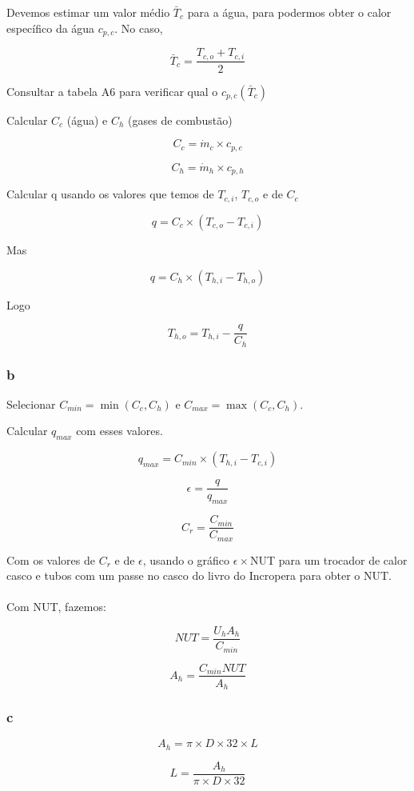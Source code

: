 \documentclass[a4paper, 12pt]{article}
\begin{document}
Devemos estimar um valor médio $\bar{T}_{c}$ para a água, para podermos obter o calor específico da água $c_{p,c}$. No caso, 

\[\bar{T}_{c} = \frac{T_{c,o}+T_{c,i}}{2}\]

Consultar a tabela A6 para verificar qual o $c_{p,c}(\bar{T}_{c})$

Calcular $C_{c}$ (água) e $C_{h}$ (gases de combustão)

\[C_{c} = \dot{m}_{c} \times c_{p,c}\]

\[C_{h} = \dot{m}_{h} \times c_{p,h}\]

Calcular q usando os valores que temos de $T_{c,i}$, $T_{c,o}$ e de $C_{c}$

\[q = C_{c} \times (T_{c,o}-T_{c,i})\]

Mas 

\[q = C_{h} \times (T_{h,i}-T_{h,o})\]

Logo

\[T_{h,o} = T_{h,i} - \frac{q}{C_{h}}\]




\subsubsection{b}

Selecionar $C_{min} = \min(C_{c},C_{h})$ e $C_{max} = \max(C_{c},C_{h})$.

Calcular $q_{max}$ com esses valores.

\[q_{max} = C_{min} \times (T_{h,i} - T_{c,i})\]

\[\epsilon = \frac{q}{q_{max}}\]

\[C_{r} = \frac{C_{min}}{C_{max}}\]

Com os valores de $C_{r}$ e de $\epsilon$, usando o gráfico $\epsilon \times$NUT para um trocador de calor casco e tubos com um passe no casco do livro do Incropera para obter o NUT.\\ \\

Com NUT, fazemos:

\[NUT = \frac{U_{h}A_{h}}{C_{min}}\]

\[A_{h}= \frac{C_{min}NUT}{A_{h}}\]


\subsubsection{c}

\[ A_{h} = \pi \times D \times 32 \times L  \] 

\[L = \frac{A_{h}}{\pi \times D \times 32 }\]
\end{document}
